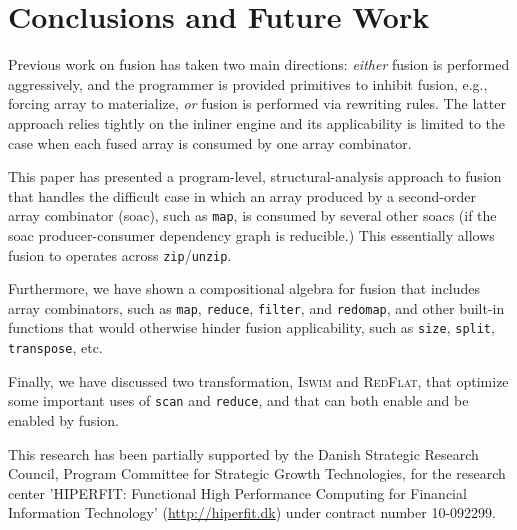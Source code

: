 \documentclass{sigplanconf}  %
\begin{document}
\section{Conclusions and Future Work}
\label{sec:Concl}

Previous work on fusion has taken two main directions:
{\em either} fusion is performed aggressively, 
and the programmer is provided primitives to inhibit fusion, 
e.g., forcing array to materialize, {\em or} fusion is 
performed via rewriting rules.  The latter approach 
relies tightly on the inliner engine and its applicability 
is limited to the case when each fused array is consumed 
by one array combinator. 

This paper has presented a program-level, structural-analysis 
approach to fusion that handles the difficult case in which 
an array produced by a second-order array combinator ({\sc soac}), 
such as {\tt map}, is consumed by several other {\sc soac}s
(if the {\sc soac} producer-consumer dependency graph
is reducible.)   This essentially allows fusion to operates
across {\tt zip}/{\tt unzip}. 

Furthermore, we have shown
a compositional algebra for fusion that includes 
array combinators, such as {\tt map}, {\tt reduce}, 
{\tt filter}, and {\tt redomap}, and other built-in
functions that would otherwise hinder fusion applicability,
such as {\tt size}, {\tt split}, {\tt transpose}, etc.

Finally, we have discussed two transformation, \textsc{Iswim}
and \textsc{RedFlat}, that optimize some important uses
of {\tt scan} and {\tt reduce}, and that can both enable and 
be enabled by fusion.


%



\acks
This research has been partially supported by the Danish
Strategic Research Council, Program Committee for Strategic Growth
Technologies, for the research center 'HIPERFIT: Functional High
Performance Computing for Financial Information Technology'
(\url{http://hiperfit.dk}) under contract number 10-092299.




\softraggedright

\end{document}
